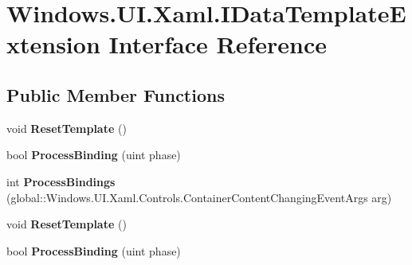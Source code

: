 \hypertarget{interface_windows_1_1_u_i_1_1_xaml_1_1_i_data_template_extension}{}\section{Windows.\+U\+I.\+Xaml.\+I\+Data\+Template\+Extension Interface Reference}
\label{interface_windows_1_1_u_i_1_1_xaml_1_1_i_data_template_extension}
\subsection*{Public Member Functions}
\begin{DoxyCompactItemize}
\item 
\mbox{\label{interface_windows_1_1_u_i_1_1_xaml_1_1_i_data_template_extension_a247edf28ad06f9d06bda7086a8b91679}} 
void {\bfseries Reset\+Template} ()
\item 
\mbox{\label{interface_windows_1_1_u_i_1_1_xaml_1_1_i_data_template_extension_a9a74e478e1d35040a1bd752b3b29a2da}} 
bool {\bfseries Process\+Binding} (uint phase)
\item 
\mbox{\label{interface_windows_1_1_u_i_1_1_xaml_1_1_i_data_template_extension_a70216df3f493851508fde43160f8a095}} 
int {\bfseries Process\+Bindings} (global\+::\+Windows.\+U\+I.\+Xaml.\+Controls.\+Container\+Content\+Changing\+Event\+Args arg)
\item 
\mbox{\label{interface_windows_1_1_u_i_1_1_xaml_1_1_i_data_template_extension_a247edf28ad06f9d06bda7086a8b91679}} 
void {\bfseries Reset\+Template} ()
\item 
\mbox{\label{interface_windows_1_1_u_i_1_1_xaml_1_1_i_data_template_extension_a9a74e478e1d35040a1bd752b3b29a2da}} 
bool {\bfseries Process\+Binding} (uint phase)
\item 
\mbox{\label{interface_windows_1_1_u_i_1_1_xaml_1_1_i_data_template_extension_a70216df3f493851508fde43160f8a095}} 

\end{DoxyCompactItemize}

